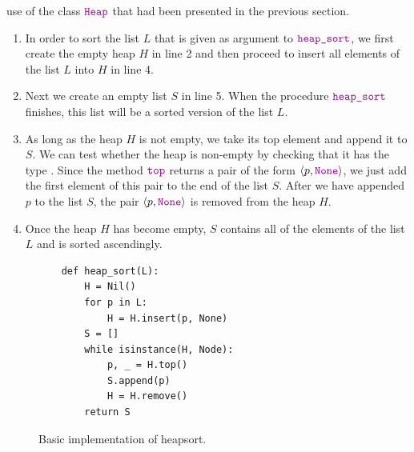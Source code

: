 use of the class $\mytt{Heap}$ that had been presented in the previous section.
\begin{enumerate}
\item In order to sort the list $L$ that is given as argument to $\mytt{heap\_sort}$, we first
      create the empty heap $H$ in line 2 and then proceed to insert all elements of the list
      $L$ into $H$ in line 4.  
\item Next we create an empty list $S$ in line 5. When the procedure $\mytt{heap\_sort}$
      finishes, this list will be a sorted version of the list $L$.
\item As long as the heap $H$ is not empty, we take its top element and append it to
      $S$.  We can test whether the heap is non-empty by checking that it has the type .
      Since the method $\mytt{top}$ returns a pair of the form $\langle p, \mytt{None}\rangle$,
      we just add the first element of this pair to the
      end of the list $S$.  After we have appended $p$ to the list $S$, the pair
      $\langle p, \mytt{None}\rangle$ is removed from the heap ${H}$.
\item Once the heap ${H}$ has become empty, ${S}$ contains all of the elements of the list ${L}$
      and is sorted ascendingly.
\end{enumerate}

\begin{figure}[!ht]
\centering
\begin{verbatim}
    def heap_sort(L):
        H = Nil()
        for p in L:
            H = H.insert(p, None)
        S = []
        while isinstance(H, Node):
            p, _ = H.top()
            S.append(p)
            H = H.remove()
        return S
\end{verbatim}
\vspace*{-0.3cm}
\caption{Basic implementation of heapsort.}
\label{fig:Heap.ipynb:heap_sort}
\end{figure}


